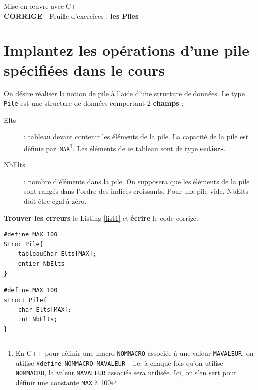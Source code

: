 \documentclass[french]{article}
\begin{document}
	
	\begin{minipage}{\textwidth}
		\begin{center}
			
			{\Large Mise en œuvre avec C++ \\ {\color{red}\textbf{CORRIGE}} - Feuille d'exercices : \textbf{les Piles}}
		\end{center}
	\end{minipage}
	\section{Implantez les opérations d’une pile spécifiées dans le cours}
On désire réaliser la notion de pile à l'aide d'une structure de données. 
Le type \texttt{Pile} est une structure de données comportant 2 \textbf{champs} :
\begin{description}
	\item[Elts] : tableau devant contenir les éléments de la pile. La capacité de la pile est définie par~\texttt{MAX}\footnote{En C++ pour définir une macro \texttt{NOMMACRO} associée à une valeur \texttt{MAVALEUR}, on utilise \texttt{\#define NOMMACRO MAVALEUR} -- i.e. à chaque fois qu'on utilise \texttt{NOMMACRO}, la valeur \texttt{MAVALEUR} associée sera utilisée. Ici, on s'en sert pour définir une constante \texttt{MAX} à 100}. Les éléments de ce tableau sont de type \textbf{entiers}.
	\item[NbElts] : nombre d’éléments dans la pile. On supposera que les éléments de la pile sont rangés dans l’ordre des indices croissants. Pour une pile vide, NbElts doit être égal à zéro.
\end{description}

\textbf{Trouver les erreurs} le Listing \ref{list1} et \textbf{écrire} le code corrigé.

\noindent\begin{minipage}{.45\textwidth}
	\begin{lstlisting}[caption={A corriger: Structure Pile},label=list1]
#define MAX 100
Struc Pile{
	tableauChar Elts[MAX];
	entier NbElts
} 
\end{lstlisting}
\end{minipage}\hfill
\begin{minipage}{.45\textwidth}
\begin{lstlisting}[caption={Corrigé: Structure Pile},label=list2]
#define MAX 100
struct Pile{
	char Elts[MAX];
	int NbElts;
} 
\end{lstlisting}
\end{minipage}
\end{document}
